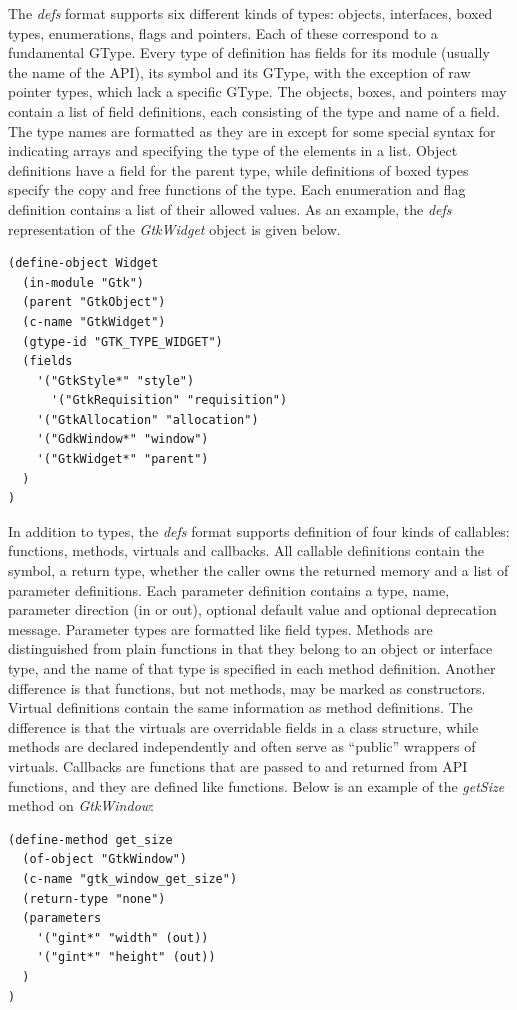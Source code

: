 \documentclass[article]{jss}
\begin{document}
The \emph{defs} format supports six different kinds of types: objects, 
interfaces, boxed types, enumerations, flags 
and pointers. Each of these correspond to a fundamental GType. Every
type of definition has fields for its module (usually the name of the API),
its  symbol and its GType, with the exception of raw pointer types,
which lack a specific GType. The objects, boxes, and pointers may contain a 
list of field definitions, each consisting of the
type and name of a field. The type names are formatted as they are in 
except for some special syntax for indicating arrays and specifying the type
of the elements in a list. Object definitions have a field for the parent type, while 
definitions of boxed types specify the copy and free functions of the type.
Each enumeration and flag definition contains a list of their allowed values.
As an example, the \emph{defs} representation of the \emph{GtkWidget} object
is given below.
\begin{verbatim}
(define-object Widget
  (in-module "Gtk")
  (parent "GtkObject")
  (c-name "GtkWidget")
  (gtype-id "GTK_TYPE_WIDGET")
  (fields
    '("GtkStyle*" "style")
	  '("GtkRequisition" "requisition")
    '("GtkAllocation" "allocation")
    '("GdkWindow*" "window")
    '("GtkWidget*" "parent")
  )
)
\end{verbatim}

In addition to types, the \emph{defs} format supports definition of four kinds
of callables: functions, methods, virtuals and callbacks. All callable definitions
contain the  symbol, a return type, whether the caller
owns the returned memory and a list of 
parameter definitions. Each parameter definition contains a 
type, name, parameter direction (in or out), optional default value and optional
deprecation message. Parameter types are formatted like field types. Methods 
are distinguished from plain functions in that they belong to an object or 
interface type, and the name of that type is specified in each method definition.
Another difference is that functions, but not methods, may be marked as constructors.
Virtual definitions contain the same information as method definitions. The difference
is that the virtuals are overridable fields in a class structure, while methods are
declared independently and often serve as ``public'' wrappers of virtuals.
Callbacks are functions that are passed to and returned from API functions, 
and they are defined like functions. Below is an example of the \emph{getSize}
method on \emph{GtkWindow}:
\begin{verbatim}
(define-method get_size
  (of-object "GtkWindow")
  (c-name "gtk_window_get_size")
  (return-type "none")
  (parameters
    '("gint*" "width" (out))
    '("gint*" "height" (out))
  )
)
\end{verbatim}
\end{document}
